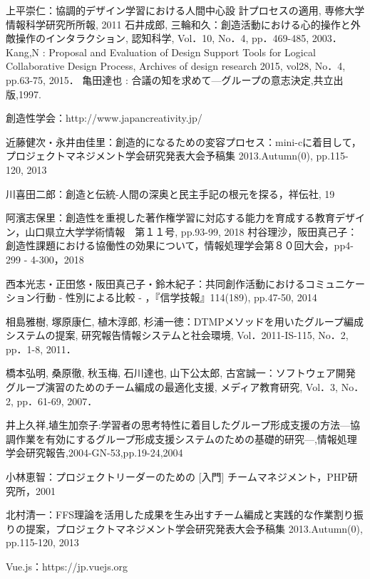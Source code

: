 \documentclass{funthesis}
\begin{document}
\begin{thebibliography}{9}
  上平崇仁：協調的デザイン学習における人間中心設 計プロセスの適用, 専修大学情報科学研究所所報, 2011
石井成郎, 三輪和久：創造活動における心的操作と外敵操作のインタラクション, 認知科学, Vol．10, No．4, pp．469-485, 2003．
Kang,N : Proposal and Evaluation of Design
Support Tools for Logical Collaborative Design Process, Archives of design research 2015, vol28, No．4, pp.63-75, 2015．
亀田達也 : 合議の知を求めて—グループの意志決定,共立出版,1997.

創造性学会：http://www.japancreativity.jp/

近藤健次・永井由佳里：創造的になるための変容プロセス：mini-cに着目して，プロジェクトマネジメント学会研究発表大会予稿集 2013.Autumn(0), pp.115-120, 2013

川喜田二郎：創造と伝統-人間の深奥と民主手記の根元を探る，祥伝社, 19

阿濱志保里：創造性を重視した著作権学習に対応する能力を育成する教育デザイン，山口県立大学学術情報　第１１号, pp.93-99, 2018
村谷理沙，阪田真己子：創造性課題における協働性の効果について，情報処理学会第８０回大会，pp4-299 - 4-300，2018

西本光志・正田悠・阪田真己子・鈴木紀子：共同創作活動におけるコミュニケーション行動 - 性別による比較 - ，『信学技報』114(189), pp.47-50, 2014

相島雅樹, 塚原康仁, 植木淳郎, 杉浦一徳：DTMPメソッドを用いたグループ編成システムの提案, 研究報告情報システムと社会環境, Vol．2011-IS-115, No．2, pp．1-8, 2011．

橋本弘明, 桑原徹, 秋玉梅, 石川達也, 山下公太郎, 古宮誠一：ソフトウェア開発グループ演習のためのチーム編成の最適化支援, メディア教育研究, Vol．3, No．2, pp．61-69, 2007． 

井上久祥,埴生加奈子:学習者の思考特性に着目したグループ形成支援の方法—協調作業を有効にするグループ形成支援システムのための基礎的研究—,情報処理学会研究報告,2004-GN-53,pp.19-24,2004

小林恵智：プロジェクトリーダーのための [入門] チームマネジメント，PHP研究所，2001

北村清一：FFS理論を活用した成果を生み出すチーム編成と実践的な作業割り振りの提案，プロジェクトマネジメント学会研究発表大会予稿集 2013.Autumn(0), pp.115-120, 2013

Vue.js：https://jp.vuejs.org





\end{thebibliography}
\end{document}
